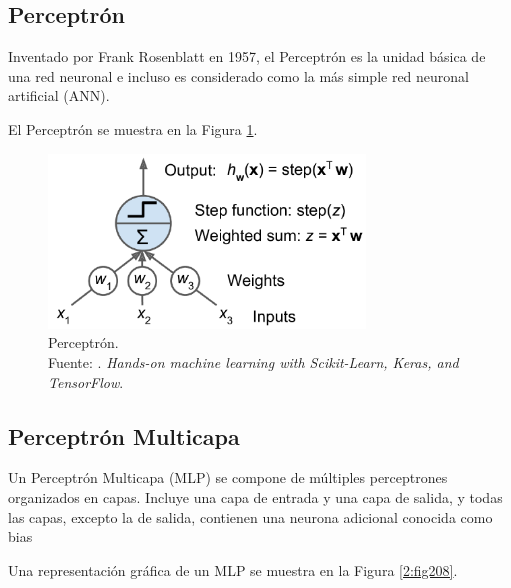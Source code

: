 \subsection{Perceptrón}
Inventado por Frank Rosenblatt en 1957, el Perceptrón es la unidad básica de una red neuronal e incluso es considerado como la más simple red neuronal artificial (ANN). \parencite{bk_geron2022handml}

El Perceptrón se muestra en la Figura \ref{2:fig207-2}.

\begin{figure}[H]
	\begin{center}
		\includegraphics[width=0.75\textwidth]{2/figures/perceptron.png}
		\caption[Perceptrón]{Perceptrón. \\
		Fuente: \cite{bk_geron2022handml}. \textit{Hands-on machine learning with Scikit-Learn, Keras, and TensorFlow}.}
		\label{2:fig207-2}
	\end{center}
\end{figure}


\subsection{Perceptrón Multicapa}
Un Perceptrón Multicapa (MLP) se compone de múltiples perceptrones organizados en capas. Incluye una capa de entrada y una capa de salida, y todas las capas, excepto la de salida, contienen una neurona adicional conocida como bias \parencite{bk_geron2022handml}

Una representación gráfica de un MLP se muestra en la Figura \ref{2:fig208}.


